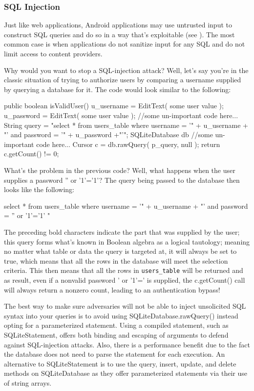\subsubsection{SQL Injection}
Just like web applications, Android applications may use untrusted input to construct SQL queries and do so in a way that's exploitable (see \cite{Makan2013}). The most common case is when applications do not sanitize input for any SQL and do not limit access to content providers.

Why would you want to stop a SQL-injection attack? Well, let's say you're in the classic situation of trying to authorize users by comparing a username supplied by querying a database for it. The code would look similar to the following:

\begin{android}
public boolean isValidUser(){ 
	u_username = EditText( some user value );
	u_password = EditText( some user value );
	//some un-important code here...
	String query = "select * from users_table 
	where username = '" +  u_username + "' and password = '" + 
	u_password
	+"'";
	SQLiteDatabase db
	//some un-important code here...
	Cursor c = db.rawQuery( p_query, null );
	return c.getCount() != 0;
}
\end{android}
What's the problem in the previous code? Well, what happens when the user supplies a password '' or '1'='1'? The query being passed to the database then looks like the following:

\begin{android}
select * from users_table where username = '" +  
u_username
+ "' and password = '' 
or '1'='1'
"
\end{android}

The preceding bold characters indicate the part that was supplied by the user; this query forms what's known in Boolean algebra as a logical tautology; meaning no matter what table or data the query is targeted at, it will always be set to true, which means that all the rows in the database will meet the selection criteria. This then means that all the rows in \texttt{users\_table} will be returned and as result, even if a nonvalid password ' or '1'=' is supplied, the c.getCount() call will always return a nonzero count, leading to an authentication bypass!

The best way to make sure adversaries will not be able to inject unsolicited SQL syntax into your queries is to avoid using SQLiteDatabase.rawQuery() instead opting for a parameterized statement. Using a compiled statement, such as SQLiteStatement, offers both binding and escaping of arguments to defend against SQL-injection attacks. Also, there is a performance benefit due to the fact the database does not need to parse the statement for each execution. An alternative to SQLiteStatement is to use the query, insert, update, and delete methods on SQLiteDatabase as they offer parameterized statements via their use of string arrays.

